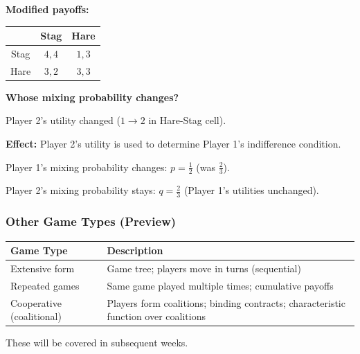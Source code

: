 \begin{exbox}
\textbf{Modified payoffs:}
\begin{center}
\renewcommand{\arraystretch}{1.2}
\begin{tabular}{@{} c | c c @{}}
 & Stag & Hare \\
\midrule
Stag & $4, 4$ & $1, 3$ \\
Hare & $3, 2$ & $3, 3$ \\
\end{tabular}
\end{center}

\textbf{Whose mixing probability changes?}

Player 2's utility changed ($1 \to 2$ in Hare-Stag cell).

\textbf{Effect:} Player 2's utility is used to determine Player 1's indifference condition.

Player 1's mixing probability changes: $p = \frac{1}{2}$ (was $\frac{2}{3}$).

Player 2's mixing probability stays: $q = \frac{2}{3}$ (Player 1's utilities unchanged).
\end{exbox}

\bigseparator

\subsubsection{Other Game Types (Preview)}

\begin{center}
\renewcommand{\arraystretch}{1.3}
\begin{tabular}{@{} l p{10cm} @{}}
\toprule
\textbf{Game Type} & \textbf{Description} \\
\midrule
Extensive form & Game tree; players move in turns (sequential) \\
Repeated games & Same game played multiple times; cumulative payoffs \\
Cooperative (coalitional) & Players form coalitions; binding contracts; characteristic function over coalitions \\
\bottomrule
\end{tabular}
\end{center}

These will be covered in subsequent weeks.
